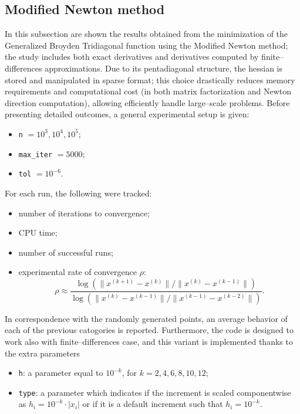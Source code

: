 \documentclass[a4paper,12pt]{article}
\begin{document}
	
	\subsection{Modified Newton method}
	In this subsection are shown the results obtained from the minimization of the Generalized Broyden Tridiagonal function using the Modified Newton method; the study includes both exact derivatives and derivatives computed by finite--differences approximations. Due to its pentadiagonal structure, the hessian is stored and manipulated in sparse format; this choice drastically reduces memory requirements and computational cost (in both matrix factorization and Newton direction computation), allowing efficiently handle large--scale problems. Before presenting detailed outcomes, a general experimental setup is given:
	\begin{itemize}
		\item \texttt{n} $= 10^{3},10^{4},10^{5}$;
		\item \texttt{max\_iter} $= 5000$;
		\item \texttt{tol} $= 10^{-6}$.
	\end{itemize}
	
	For each run, the following were tracked:
	\begin{itemize}
		\item number of iterations to convergence;
		\item CPU time;
		\item number of successful runs;
		\item experimental rate of convergence \(\rho\):
		\[
		\rho \approx \frac{\log\left(\|x^{(k+1)} - x^{(k)}\|\big/\|x^{(k)} - x^{(k-1)}\|\right)}{\log\left(\|x^{(k)} - x^{(k-1)}\|\big/\|x^{(k-1)} - x^{(k-2)}\|\right)}.
		\]
		\end{itemize}
	In correspondence with the randomly generated points, an average behavior of each of the previous catogories is reported. Furthermore, the code is designed to work also with finite--differences case,  and this variant is implemented thanks to the extra parameters 
	\begin{itemize}
		\item \texttt{h}: a parameter equal to \(10^{-k} \), for \( k = 2, 4, 6, 8, 10, 12 \);
		\item \texttt{type}: a parameter which indicates if the increment is scaled componentwise as \( h_i = 10^{-k} \cdot |x_i| \) or if it is a default increment such that \( h_i = 10^{-k}\). 
	\end{itemize}
	
\end{document}
